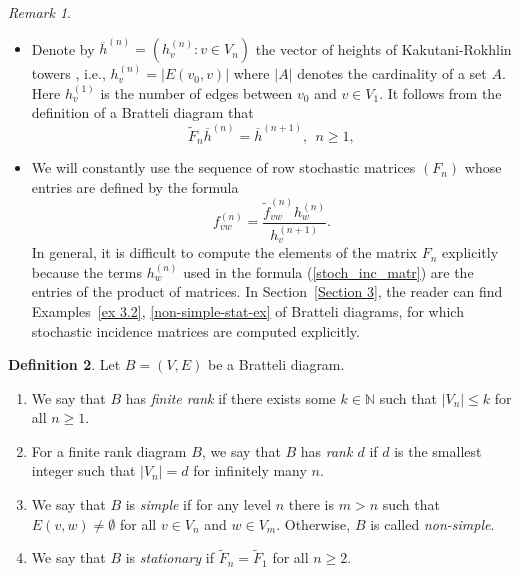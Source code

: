 \documentclass[11pt, english, reqno]{amsart}
\theoremstyle{definition}
\newtheorem{defin}{Definition}[section]
\theoremstyle{remark}
\newtheorem{remark}[defin]{Remark}
\theoremstyle{plain}
\def\ov{\overline}
\def\tl{\widetilde}
\numberwithin{equation}{section}
\begin{document}
\begin{remark}
\begin{itemize}
\item Denote by $\ov h^{(n)} = (h_v^{(n)} : v \in V_n)$ the  vector of
 heights of  Kakutani-Rokhlin towers \cite{GiordanoPutnamSkau1995,
  HermanPutnamSkau1992}, i.e.,   $h_v^{(n)} = |E(v_0, v)|$ where $|A|$
  denotes the  cardinality of a set $A$. Here $h^{(1)}_{v}$ is
   the number of    edges   between $v_0$ and $v \in V_1$.   It
   follows from the definition of a  Bratteli diagram that
\begin{equation}\label{formula for heights}
\tl F_n \ov h^{(n)} = \ov  h^{(n+1)}, \ \ n \geq 1,
\end{equation}

\item We will constantly use the sequence of row stochastic  matrices
$(F_n)$  whose entries are defined by the formula
\begin{equation}\label{stoch_inc_matr}
f_{vw}^{(n)} = \frac{\tl f_{vw}^{(n)} h_w^{(n)}}{h_v^{(n+1)}}.
\end{equation}
In general, it is difficult to compute the elements of the matrix $F_n$ explicitly because the terms $h_w^{(n)}$ used in the formula (\ref{stoch_inc_matr}) are the entries of the product of matrices. In Section~\ref{Section 3}, the reader can find Examples~\ref{ex 3.2}, \ref{non-simple-stat-ex} of Bratteli diagrams, for which stochastic incidence matrices are computed explicitly. 
  \end{itemize}
\end{remark}

\begin{defin}\label{rank_d_definition} Let $B = (V, E)$ be a
Bratteli diagram.

\begin{enumerate}
\item
We say that $B$ has \textit{finite rank} if there exists some
 $k\in \mathbb N$ such that $|V_n| \leq k$  for all $n\geq 1$.

\item
For a finite rank diagram $B$, we  say that $B$ has
\textit{rank $d$} if  $d$ is the smallest integer such that $|V_n|=d$
 for infinitely many $n$.

\item
We say that $B$ is {\em simple} if for any level
$n$ there is $m>n$ such that $E(v,w) \neq \emptyset$ for all $v\in
V_n$ and $w\in V_m$. Otherwise, $B$ is called {\em non-simple}.

\item
 We say that $B$ is  \textit{stationary} if $\tl F_n = \tl F_1$  for all $n\geq
  2$.
\end{enumerate}
\end{defin}
\end{document}
